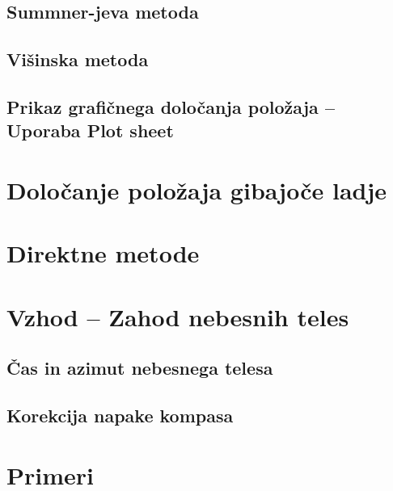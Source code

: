 \subsection{Summner-jeva metoda}
\subsection{Višinska metoda}
\subsection{Prikaz grafičnega določanja položaja -- Uporaba Plot sheet}

\section{Določanje položaja gibajoče ladje}

\section{Direktne metode}

\section{Vzhod -- Zahod nebesnih teles}
\subsection{Čas in azimut nebesnega telesa}
\subsection{Korekcija napake kompasa}

\section{Primeri}